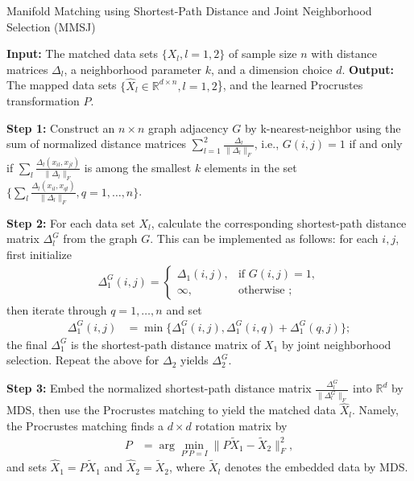 \documentclass[times,twocolumn,final]{elsarticle}
\begin{document}
\begin{algorithm}
\caption{Manifold Matching using Shortest-Path Distance and Joint Neighborhood Selection (MMSJ)}
\label{alg1}
\begin{algorithmic}
\State \textbf{Input: } The matched data sets $\{X_{l}, l=1,2\}$ of sample size $n$ with distance matrices $\Delta_{l}$, a neighborhood parameter $k$, and a dimension choice $d$.
\State \textbf{Output: }The mapped data sets $\{\hat{X}_{l} \in \mathbb{R}^{d \times n}, l=1,2$\}, and the learned Procrustes transformation $P$.

\State \textbf{Step 1: } Construct an $n \times n$ graph adjacency $G$ by k-nearest-neighbor using the sum of normalized distance matrices $\sum_{l=1}^{2} \frac{\Delta_{l}}{\|\Delta_{l}\|_{F}}$, i.e., $G(i,j)=1$ if and only if $\sum_{l} \frac{\Delta_{l}(x_{il},x_{jl})}{\|\Delta_{l}\|_{F}}$ is among the smallest $k$ elements in the set $\{ \sum_{l} \frac{\Delta_{l}(x_{il},x_{ql})} {\|\Delta_{l}\|_{F}}, q=1,\ldots,n \}$.

\State \textbf{Step 2: } For each data set $X_{l}$, calculate the corresponding shortest-path distance matrix $\Delta_{l}^{G}$ from the graph $G$. This can be implemented as follows: for each $i,j$, first initialize 
\begin{align*}
    \Delta_{1}^{G}(i,j)=
    \begin{cases}
      \Delta_{1}(i,j), & \text{if } G(i,j)=1, \\
			\infty, & \text{otherwise } ; 
    \end{cases}
\end{align*}
then iterate through $q=1,\ldots,n$ and set 
\begin{align*}
\Delta_{1}^{G}(i,j)&=\min\{{\Delta_{1}^{G}}(i,j),\Delta_{1}^{G}(i,q)+\Delta_{1}^{G}(q,j)\};
\end{align*}
the final $\Delta_{1}^{G}$ is the shortest-path distance matrix of $X_{1}$ by joint neighborhood selection. Repeat the above for $\Delta_{2}$ yields $\Delta_{2}^{G}$.  

\State \textbf{Step 3: } Embed the normalized shortest-path distance matrix $\frac{\Delta_{l}^{G}}{\|\Delta_{l}^{G}\|_{F}}$ into $\mathbb{R}^{d}$ by MDS, then use the Procrustes matching to yield the matched data $\hat{X}_{l}$. Namely, the Procrustes matching finds a $d \times d$ rotation matrix by
\begin{align*}
P&=\arg\min_{P'P=I} \|P \tilde{X}_{1}-\tilde{X}_{2}\|_{F}^{2},
\end{align*}
and sets $\hat{X}_{1}=P \tilde{X}_{1}$ and $\hat{X}_{2}=\tilde{X}_{2}$, where $\tilde{X}_{l}$ denotes the embedded data by MDS.
\end{algorithmic}
\end{algorithm}
\end{document}

